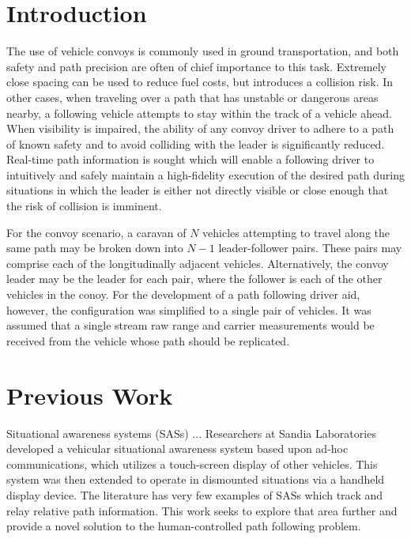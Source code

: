 \documentclass[twocolumn,10pt]{article}
\begin{document}

\section*{Introduction}

  The use of vehicle convoys is commonly used in ground transportation, and both safety and path precision are often of chief importance to this task.  Extremely close spacing can be used to reduce fuel costs, but introduces a collision risk.  In other cases, when traveling over a path that has unstable or dangerous areas nearby, a following vehicle attempts to stay within the track of a vehicle ahead.  When visibility is impaired, the ability of any convoy driver to adhere to a path of known safety and to avoid colliding with the leader is significantly reduced.  Real-time path information is sought which will enable a following driver to intuitively and safely maintain a high-fidelity execution of the desired path during situations in which the leader is either not directly visible or close enough that the risk of collision is imminent.

  For the convoy scenario, a caravan of $N$ vehicles attempting to travel along the same path may be broken down into $N-1$ leader-follower pairs.  These pairs may comprise each of the longitudinally adjacent vehicles.  Alternatively, the convoy leader may be the leader for each pair, where the follower is each of the other vehicles in the conoy.  For the development of a path following driver aid, however, the configuration was simplified to a single pair of vehicles.  It was assumed that a single stream raw range and carrier measurements would be received from the vehicle whose path should be replicated.



\section*{Previous Work}
  Situational awareness systems (SASs) ... 
  Researchers at Sandia Laboratories \cite{riblett2007} developed a vehicular situational awareness system based upon ad-hoc communications, which utilizes a touch-screen display of other vehicles. This system was then extended to operate in dismounted situations via a handheld display device.
  The literature has very few examples of SASs which track and relay relative path information. This work seeks to explore that area further and provide a novel solution to the human-controlled path following problem.\
\end{document}
